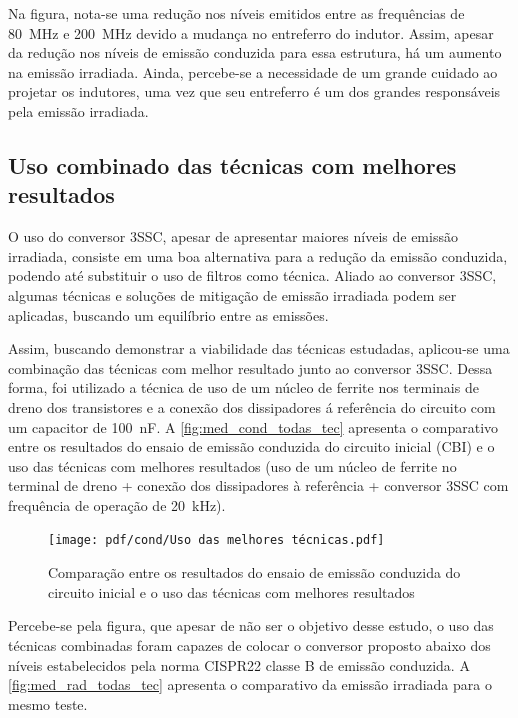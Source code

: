     Na figura, nota-se uma redução nos níveis emitidos entre as frequências de \qty{80}{\mega\hertz} e \qty{200}{\mega\hertz} devido a mudança no entreferro do indutor. Assim, apesar da redução nos níveis de emissão conduzida para essa estrutura, há um aumento na emissão irradiada. Ainda, percebe-se a necessidade de um grande cuidado ao projetar os indutores, uma vez que seu entreferro é um dos grandes responsáveis pela emissão irradiada. 
    \subsection{Uso combinado das técnicas com melhores resultados} \label{cap:result_tecnicas_total}
    
    O uso do conversor 3SSC, apesar de apresentar maiores níveis de emissão irradiada, consiste em uma boa alternativa para a redução da emissão conduzida, podendo até substituir o uso de filtros como técnica. Aliado ao conversor 3SSC, algumas técnicas e soluções de mitigação de emissão irradiada podem ser aplicadas, buscando um equilíbrio entre as emissões. 
    
    Assim, buscando demonstrar a viabilidade das técnicas estudadas, aplicou-se uma combinação das técnicas com melhor resultado junto ao conversor 3SSC. Dessa forma, foi utilizado a técnica de uso de um núcleo de ferrite nos terminais de dreno dos transistores e a conexão dos dissipadores á referência do circuito com um capacitor de \qty{100}{\nano\farad}. A \autoref{fig:med_cond_todas_tec} apresenta o comparativo entre os resultados do ensaio de emissão conduzida do circuito inicial (CBI) e o uso das técnicas com melhores resultados (uso de um núcleo de ferrite no terminal de dreno + conexão dos dissipadores à referência + conversor 3SSC com frequência de operação de \qty{20}{\kilo\hertz}).
    
    \begin{figure}[H]
    	\centering
    	\caption{Comparação entre os resultados do ensaio de emissão conduzida do circuito inicial e o uso das técnicas com melhores resultados}
    	\texttt{[image: pdf/cond/Uso das melhores técnicas.pdf]}
    	\label{fig:med_cond_todas_tec}
    \end{figure}
    
    Percebe-se pela figura, que apesar de não ser o objetivo desse estudo, o uso das técnicas combinadas foram capazes de colocar o conversor proposto abaixo dos níveis estabelecidos pela norma CISPR22 classe B de emissão conduzida. A \autoref{fig:med_rad_todas_tec} apresenta o comparativo da emissão irradiada para o mesmo teste. 
    
